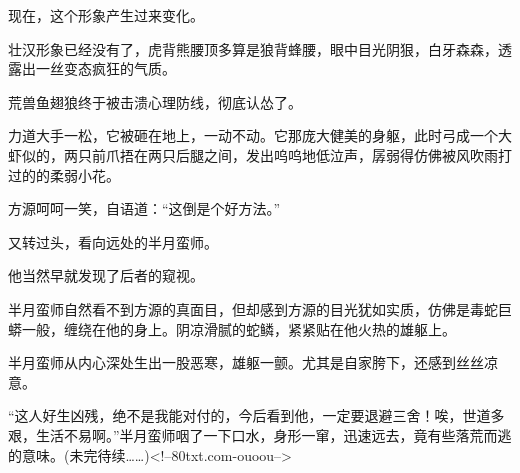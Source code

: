 \begin{this_body}
现在，这个形象产生过来变化。

壮汉形象已经没有了，虎背熊腰顶多算是狼背蜂腰，眼中目光阴狠，白牙森森，透露出一丝变态疯狂的气质。

荒兽鱼翅狼终于被击溃心理防线，彻底认怂了。

力道大手一松，它被砸在地上，一动不动。它那庞大健美的身躯，此时弓成一个大虾似的，两只前爪捂在两只后腿之间，发出呜呜地低泣声，孱弱得仿佛被风吹雨打过的的柔弱小花。

方源呵呵一笑，自语道：“这倒是个好方法。”

又转过头，看向远处的半月蛮师。

他当然早就发现了后者的窥视。

半月蛮师自然看不到方源的真面目，但却感到方源的目光犹如实质，仿佛是毒蛇巨蟒一般，缠绕在他的身上。阴凉滑腻的蛇鳞，紧紧贴在他火热的雄躯上。

半月蛮师从内心深处生出一股恶寒，雄躯一颤。尤其是自家胯下，还感到丝丝凉意。

“这人好生凶残，绝不是我能对付的，今后看到他，一定要退避三舍！唉，世道多艰，生活不易啊。”半月蛮师咽了一下口水，身形一窜，迅速远去，竟有些落荒而逃的意味。(未完待续……)<!--80txt.com-ouoou-->

\end{this_body}

